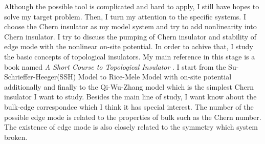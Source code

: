 \documentclass[fontsize=11pt, %
                             paper=a4, %
                             twoside, %
                             captions=tableheading,
                             index=totoc,
                             hyperref]{labbook}
\begin{document}
\begin{addmargin}[4cm]{0cm}
Although the possible tool is complicated and hard to apply, I still have hopes to solve my target problem. Then, I turn my attention to the specific systems. I choose the Chern insulator as my model system and try to add nonlinearity into Chern insulator. I try to discuss the pumping of Chern insulator and stability of edge mode with the nonlinear on-site potential. In order to achive that, I study the basic concepts of topological insulators. My main reference in this stage is a book named \emph{A Short Course to Topological Insulator} \cite{JanosK.Asboth2016}. I start from the Su-Schrieffer-Heeger(SSH) Model to Rice-Mele Model with on-site potential additionally and finally to the Qi-Wu-Zhang model which is the simplest Chern insulator I want to study. Besides the main line of study, I want know about the bulk-edge correspondce which I think it has special interest. The number of the possible edge mode is related to the properties of bulk such as the Chern number. The existence of edge mode is also closely related to the symmetry which system broken. \\


\end{addmargin}
\end{document}

